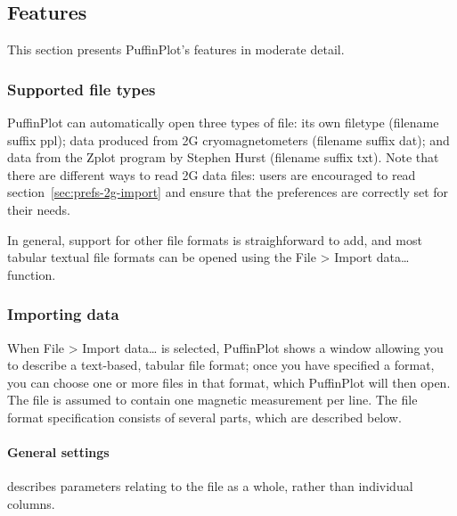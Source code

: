 \documentclass[a4paper,british]{article}
\newcommand{\ppcmd}[1]{\textsf{#1}} %
\newcommand{\caps}[1]{\MakeTextUppercase{#1}} %
\newcommand{\submenu}{ \textgreater{} } %
\begin{document}
\subsection{Features}

This section presents PuffinPlot's features in moderate detail.

\subsubsection{\label{sec:file-types}Supported file types}

PuffinPlot can automatically open three types of file: its own filetype
(filename suffix \ppcmd{ppl}); data produced from 2\caps{g} cryomagnetometers
(filename suffix \ppcmd{dat}); and data from the {\sf Zplot} program by
Stephen Hurst (filename suffix \ppcmd{txt}). Note that there are different
ways to read 2\caps{g} data files: users are encouraged to read
section~\ref{sec:prefs-2g-import} and ensure that the preferences are
correctly set for their needs.

In general, support for other file formats is straighforward to add, and most
tabular textual file formats can be opened using the \ppcmd{File\submenu
  Import data\ldots} function.

\subsubsection{\label{sec:import-data}Importing data}

When \ppcmd{File\submenu Import data\ldots} is selected, PuffinPlot shows a
window allowing you to describe a text-based, tabular file format; once you
have specified a format, you can choose one or more files in that format,
which PuffinPlot will then open. The file is assumed to contain one magnetic
measurement per line. The file format specification consists of several
parts, which are described below.

\paragraph{General settings} describes parameters relating to the file as a
whole, rather than individual columns.
\end{document}
